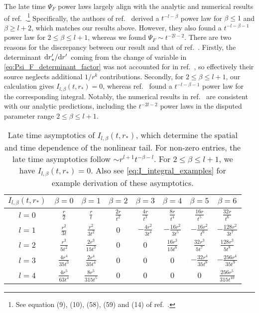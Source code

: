 \documentclass[reprint,aps,physrev,superscriptaddress,10pt,notitlepage,prd,nofootinbib,onecolumn]{revtex4-2}
\begin{document}
The late time $\Psi_F$ power laws largely align with the analytic and numerical results of ref.~\cite{Cardoso:2024jme}.\footnote{See equation (9), (10), (58), (59) and (14) of ref.~\cite{Cardoso:2024jme}.}
Specifically, the authors of ref.~\cite{Cardoso:2024jme} derived a $t^{-l-\beta}$ power law for $\beta \leq 1$ and $\beta \geq l+2$, which matches our results above.
However, they also found a $t^{-l-\beta-1}$ power law for $2 \leq \beta \leq l+1$, whereas we found $\Psi_F \sim t^{-2l-2}$.
There are two reasons for the discrepancy between our result and that of ref.~\cite{Cardoso:2024jme}.
Firstly, the determinant $\dv*{r_*'}{r'}$ coming from the change of variable in \eqref{eq:Psi_F_determinant_factor} was not accounted for in ref.~\cite{Cardoso:2024jme}, so effectively their source neglects additional $1/r^k$ contributions.
Secondly, for $2 \leq \beta \leq l+1$, our calculation gives $I_{l,\beta}(t,r_*) = 0$, whereas ref.~\cite{Cardoso:2024jme} found a $t^{-l-\beta-1}$ power law for the corresponding integral.
Notably, the numerical results in ref.~\cite{Cardoso:2024jme} are consistent with our analytic predictions, including the $t^{-2l-2}$ power laws in the disputed parameter range $2 \leq \beta \leq l+1$.



\renewcommand{\arraystretch}{1.5}
\begin{table}[t]
  \centering
  \begin{tabular}{|c|c|c|c|c|c|c|c|}
    \hline
    $I_{l,\beta}(t,r_*)$ & $\beta=0$ & $\beta=1$ & $\beta=2$ & $\beta=3$ & $\beta=4$ & $\beta=5$ & $\beta=6$ \\
    \hline
    $l=0$&$\frac{r}{2}$&$\frac{r}{t}$&$\frac{2 r}{t^2}$&$\frac{4 r}{t^3}$&$\frac{8 r}{t^4}$&$\frac{16 r}{t^5}$&$\frac{32 r}{t^6}$\\$l=1$&$\frac{r^2}{3 t}$&$\frac{r^2}{3 t^2}$&$0$&$-\frac{4 r^2}{3 t^4}$&$-\frac{16 r^2}{3 t^5}$&$-\frac{16 r^2}{t^6}$&$-\frac{128 r^2}{3 t^7}$\\$l=2$&$\frac{r^3}{5 t^2}$&$\frac{2 r^3}{15 t^3}$&$0$&$0$&$\frac{16 r^3}{15 t^6}$&$\frac{32 r^3}{5 t^7}$&$\frac{128 r^3}{5 t^8}$\\$l=3$&$\frac{4 r^4}{35 t^3}$&$\frac{2 r^4}{35 t^4}$&$0$&$0$&$0$&$-\frac{32 r^4}{35 t^8}$&$-\frac{256 r^4}{35 t^9}$\\$l=4$&$\frac{4 r^5}{63 t^4}$&$\frac{8 r^5}{315 t^5}$&$0$&$0$&$0$&$0$&$\frac{256 r^5}{315 t^{10}}$ \\
    \hline
  \end{tabular}
  \caption{Late time asymptotics of $I_{l,\beta}(t,r_*)$, which determine the spatial and time dependence of the nonlinear tail.
    For non-zero entries, the late time asymptotics follow $\sim r^{l+1} t^{-\beta-l}$.
    For $2 \leq \beta \leq l+1$, we have $I_{l,\beta}(t,r_*) = 0$.
    Also see \eqref{eq:I_integral_examples} for example derivation of these asymptotics.}
  \label{tab:nonlinear_tail_amplitudes}
\end{table}
\end{document}
